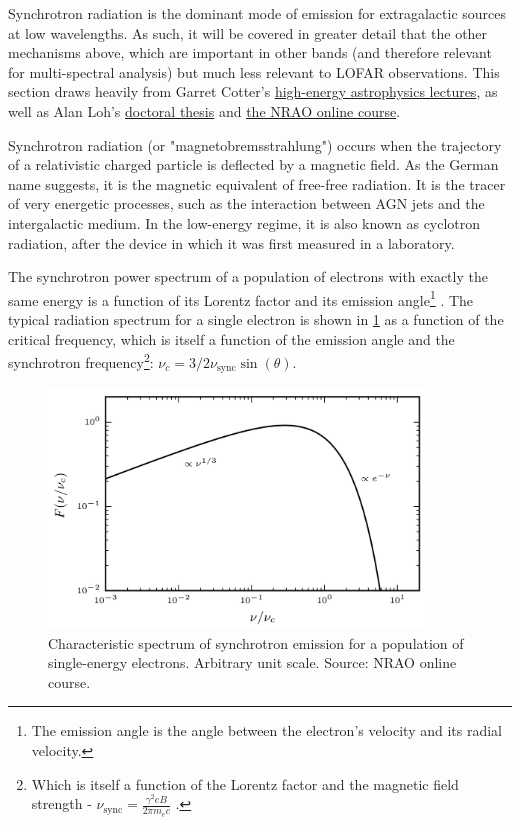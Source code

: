 \pg
Synchrotron radiation is the dominant mode of emission for extragalactic sources at low wavelengths. As such, it will be covered in greater detail that the other mechanisms above, which are important in other bands (and therefore relevant for multi-spectral analysis) but much less relevant to LOFAR observations. This section draws heavily from Garret Cotter's \href{http://www-astro.physics.ox.ac.uk/~garret/teaching/}{high-energy astrophysics lectures}, as well as Alan Loh's \href{http://theses.md.univ-paris-diderot.fr/LOH_Alan_2_va_20160930.pdf}{doctoral thesis} and \href{https://www.cv.nrao.edu/course/astr534/SelfAbsorption.html}{the NRAO online course}.

\pg
Synchrotron radiation (or "magnetobremsstrahlung") occurs when the trajectory of a relativistic charged particle is deflected by a magnetic field. As the German name suggests, it is the magnetic equivalent of free-free radiation. It is the tracer of very energetic processes, such as the interaction between AGN jets and the intergalactic medium. In the low-energy regime, it is also known as cyclotron radiation, after the device in which it was first measured in a laboratory. %

\pg
The synchrotron power spectrum of a population of electrons with exactly the same energy is a function of its Lorentz factor and its emission angle\footnote{The emission angle is the angle between the electron's velocity and its radial velocity.} . The typical radiation spectrum for a single electron is shown in \cref{fig.synchrotron.1electrion} as a function of the critical frequency, which is itself a function of the emission angle and the synchrotron frequency\footnote{Which is itself a function of the Lorentz factor and the magnetic field strength - $\nu_\mathrm{sync}=\frac{\gamma^2 e B}{2\pi m_e c}$ .}: $\nu_c=3/2\nu_\mathrm{sync}\sin(\theta)$.
\begin{figure}[!h]
\centering
\includegraphics[width=0.9\textwidth]{images/Synchrotron-single-electron.png}
\caption{\label{fig.synchrotron.1electrion} Characteristic spectrum of synchrotron emission for a population of single-energy electrons. Arbitrary unit scale. Source: NRAO online course.}
\end{figure}

